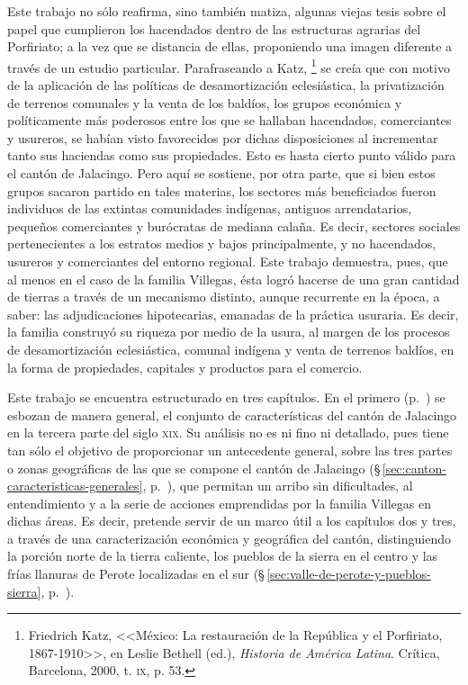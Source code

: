 \documentclass[14pt,twoside,final]{extbook} %
\let\oldfootnote\footnote
\renewcommand\footnote[1]{%
\oldfootnote{\hspace{1mm}#1}}
\begin{document}
Este trabajo no sólo reafirma, sino también matiza, algunas viejas tesis sobre el papel que cumplieron los hacendados dentro de las estructuras agrarias del Porfiriato; a la vez que se distancia de ellas, proponiendo una imagen diferente a través de un estudio particular. Parafraseando a Katz,\footnote{Friedrich Katz, <<México: La restauración de la República y el Porfiriato, 1867-1910>>, en Leslie Bethell (ed.), \emph{Historia de América Latina}. Crítica, Barcelona, 2000, t. \textsc{ix}, p. 53.} se creía que con motivo de la aplicación de las políticas de desamortización eclesiástica, la privatización de terrenos comunales y la venta de los baldíos, los grupos económica y políticamente más poderosos entre los que se hallaban hacendados, comerciantes y usureros, se habían visto favorecidos por dichas disposiciones al incrementar tanto sus haciendas como sus propiedades. Esto es hasta cierto punto válido para el cantón de Jalacingo. Pero aquí se sostiene, por otra parte, que si bien estos grupos sacaron partido en tales materias, los sectores más beneficiados fueron individuos de las extintas comunidades indígenas, antiguos arrendatarios, pequeños comerciantes y burócratas de mediana calaña. Es decir, sectores sociales pertenecientes a los estratos medios y bajos principalmente, y no hacendados, usureros y comerciantes del entorno regional. Este trabajo demuestra, pues, que al menos en el caso de la familia Villegas, ésta logró hacerse de una gran cantidad de tierras a través de un mecanismo distinto, aunque recurrente en la época, a saber: las adjudicaciones hipotecarias, emanadas de la práctica usuraria. Es decir, la familia construyó su riqueza por medio de la usura, al margen de los procesos de desamortización eclesiástica, comunal indígena y venta de terrenos baldíos, en la forma de propiedades, capitales y productos para el comercio.

Este trabajo se encuentra estructurado en tres capítulos. En el primero (p.~\pageref{ch:capitulo-uno}) se esbozan de manera general, el conjunto de características del cantón de Jalacingo en la tercera parte del siglo \textsc{xix}. Su análisis no es ni fino ni detallado, pues tiene tan sólo el objetivo de proporcionar un antecedente general, sobre las tres partes o zonas geográficas de las que se compone el cantón de Jalacingo (\S\,\ref{sec:canton-caracteristicas-generales}, p.~\pageref{sec:canton-caracteristicas-generales}), que permitan un arribo sin dificultades, al entendimiento y a la serie de acciones emprendidas por la familia Villegas en dichas áreas. Es decir, pretende servir de un marco útil a los capítulos dos y tres, a través de una caracterización económica y geográfica del cantón, distinguiendo la porción norte de la tierra caliente, los pueblos de la sierra en el centro y las frías llanuras de Perote localizadas en el sur (\S\,\ref{sec:valle-de-perote-y-pueblos-sierra}, p.~\pageref{sec:valle-de-perote-y-pueblos-sierra}).
\end{document}
